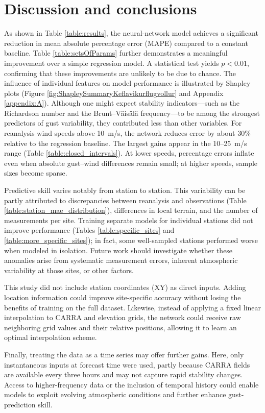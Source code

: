 \chapter{Discussion and conclusions}
\label{Chapter5}
As shown in Table \ref{table:results}, the neural-network model achieves a significant reduction in mean absolute percentage error (MAPE) compared to a constant baseline. Table \ref{table:setsOfParams} further demonstrates a meaningful improvement over a simple regression model. A statistical test yields $p<0.01$, confirming that these improvements are unlikely to be due to chance. The influence of individual features on model performance is illustrated by Shapley plots (Figure \ref{fig:ShapleySummaryKeflavikurflugvollur} and Appendix \ref{appendix:A}). Although one might expect stability indicators—such as the Richardson number and the Brunt--Väisälä frequency—to be among the strongest predictors of gust variability, they contributed less than other variables. For reanalysis wind speeds above 10~m/s, the network reduces error by about 30\% relative to the regression baseline. The largest gains appear in the 10--25~m/s range (Table \ref{table:closed_intervals}). At lower speeds, percentage errors inflate even when absolute gust--wind differences remain small; at higher speeds, sample sizes become sparse.

Predictive skill varies notably from station to station. This variability can be partly attributed to discrepancies between reanalysis and observations (Table \ref{table:station_mae_distribution}), differences in local terrain, and the number of measurements per site. Training separate models for individual stations did not improve performance (Tables \ref{table:specific_sites} and \ref{table:more_specific_sites}); in fact, some well-sampled stations performed worse when modeled in isolation. Future work should investigate whether these anomalies arise from systematic measurement errors, inherent atmospheric variability at those sites, or other factors.

This study did not include station coordinates (XY) as direct inputs. Adding location information could improve site-specific accuracy without losing the benefits of training on the full dataset. Likewise, instead of applying a fixed linear interpolation to CARRA and elevation grids, the network could receive raw neighboring grid values and their relative positions, allowing it to learn an optimal interpolation scheme.

Finally, treating the data as a time series may offer further gains. Here, only instantaneous inputs at forecast time were used, partly because CARRA fields are available every three hours and may not capture rapid stability changes. Access to higher-frequency data or the inclusion of temporal history could enable models to exploit evolving atmospheric conditions and further enhance gust-prediction skill.
